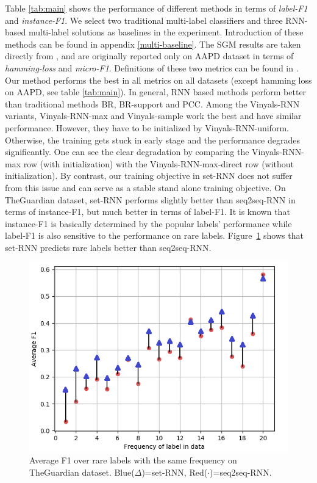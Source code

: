 Table \ref{tab:main} shows the performance of different methods in terms of \emph{label-F1} and \emph{instance-F1}. We select two traditional multi-label classifiers and three RNN-based multi-label solutions as baselines in the experiment. Introduction of these methods can be found in appendix \ref{multi-baseline}. The SGM results are taken directly from \cite{DBLP:journals/corr/abs-1806-04822}, and are originally reported only on AAPD dataset in terms of \emph{hamming-loss} and \emph{micro-F1}. Definitions of these two metrics can be found in \cite{koyejo2015consistent}. Our method performs the best in all metrics on all datasets (except hamming loss on AAPD, see table \ref{tab:main}). In general, RNN based methods perform better than traditional methods BR, BR-support and PCC. Among the Vinyals-RNN variants, Vinyals-RNN-max and Vinyals-sample work the best and have similar performance. However, they have to be initialized by Vinyals-RNN-uniform. Otherwise, the training gets stuck in early stage and the performance degrades significantly. One can see the clear degradation by comparing the Vinyals-RNN-max row (with initialization) with the Vinyals-RNN-max-direct row (without initialization). By contrast, our training objective in set-RNN does not suffer from this issue and can serve as a stable stand alone training objective. On TheGuardian dataset, set-RNN performs slightly better than seq2seq-RNN in terms of instance-F1, but much better in terms of label-F1. It is known that instance-F1 is basically determined by the popular labels' performance while label-F1 is also sensitive to the performance on rare labels. Figure~\ref{fig:labelf1} shows that set-RNN predicts rare labels better than seq2seq-RNN.

\begin{figure}[t]
\centering
\includegraphics[width=0.5\columnwidth]{Images/labelf1_v2.png}
\caption{Average F1 over rare labels with the same frequency on TheGuardian dataset. Blue($\Delta$)=set-RNN, Red($\cdot$)=seq2seq-RNN.}
\label{fig:labelf1}
\end{figure}


